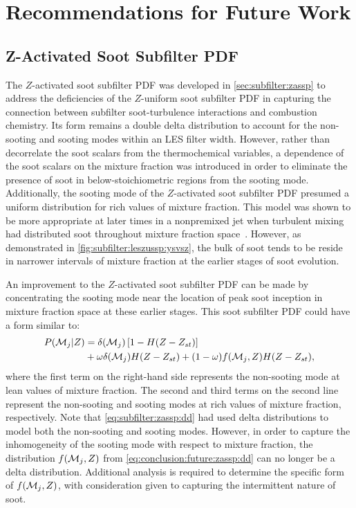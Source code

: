 \section{Recommendations for Future Work}
\label{sec:conclusion:future}

\subsection{Z-Activated Soot Subfilter PDF}
\label{sec:conclusion:future:zassp}

The $Z$-activated soot subfilter PDF was developed in \cref{sec:subfilter:zassp} to address the deficiencies of the $Z$-uniform soot subfilter PDF in capturing the connection between subfilter soot-turbulence interactions and combustion chemistry. Its form remains a double delta distribution to account for the non-sooting and sooting modes within an LES filter width. However, rather than decorrelate the soot scalars from the thermochemical variables, a dependence of the soot scalars on the mixture fraction was introduced in order to eliminate the presence of soot in below-stoichiometric regions from the sooting mode. Additionally, the sooting mode of the $Z$-activated soot subfilter PDF presumed a uniform distribution for rich values of mixture fraction. This model was shown to be more appropriate at later times in a nonpremixed jet when turbulent mixing had distributed soot throughout mixture fraction space~\cite{attili2014}. However, as demonstrated in \cref{fig:subfilter:leszussp:ysvsz}, the bulk of soot tends to be reside in narrower intervals of mixture fraction at the earlier stages of soot evolution.

An improvement to the $Z$-activated soot subfilter PDF can be made by concentrating the sooting mode near the location of peak soot inception in mixture fraction space at these earlier stages. This soot subfilter PDF could have a form similar to:
\begin{equation}\label{eq:conclusion:future:zassp:dd}
  \begin{split}
    P(\mathcal{M}_j|Z) &= \delta(\mathcal{M}_j)\left[ 1 - H(Z - Z_{st}) \right] \\
    &+ \omega\delta(\mathcal{M}_j)H(Z - Z_{st}) + (1 - \omega)f(\mathcal{M}_j, Z)H(Z - Z_{st}),
  \end{split}
\end{equation}
where the first term on the right-hand side represents the non-sooting mode at lean values of mixture fraction. The second and third terms on the second line represent the non-sooting and sooting modes at rich values of mixture fraction, respectively. Note that \cref{eq:subfilter:zassp:dd} had used delta distributions to model both the non-sooting and sooting modes. However, in order to capture the inhomogeneity of the sooting mode with respect to mixture fraction, the distribution $f(\mathcal{M}_j, Z)$ from \cref{eq:conclusion:future:zassp:dd} can no longer be a delta distribution. Additional analysis is required to determine the specific form of $f(\mathcal{M}_j, Z)$, with consideration given to capturing the intermittent nature of soot.

